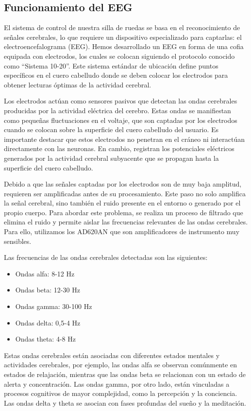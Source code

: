 \documentclass{article}
\begin{document}
\subsection{Funcionamiento del EEG}

El sistema de control de nuestra silla de ruedas se basa en el reconocimiento de señales cerebrales, lo que requiere un dispositivo especializado para captarlas: el electroencefalograma (EEG). Hemos desarrollado un EEG en forma de una cofia equipada con electrodos, los cuales se colocan siguiendo el protocolo conocido como “Sistema 10-20”. Este sistema estándar de ubicación define puntos específicos en el cuero cabelludo donde se deben colocar los electrodos para obtener lecturas óptimas de la actividad cerebral.

Los electrodos actúan como sensores pasivos que detectan las ondas cerebrales producidas por la actividad eléctrica del cerebro. Estas ondas se manifiestan como pequeñas fluctuaciones en el voltaje, que son captadas por los electrodos cuando se colocan sobre la superficie del cuero cabelludo del usuario. Es importante destacar que estos electrodos no penetran en el cráneo ni interactúan directamente con las neuronas. En cambio, registran los potenciales eléctricos generados por la actividad cerebral subyacente que se propagan hasta la superficie del cuero cabelludo.

Debido a que las señales captadas por los electrodos son de muy baja amplitud, requieren ser amplificadas antes de su procesamiento. Este paso no solo amplifica la señal cerebral, sino también el ruido presente en el entorno o generado por el propio cuerpo. Para abordar este problema, se realiza un proceso de filtrado que elimina el ruido y permite aislar las frecuencias relevantes de las ondas cerebrales. Para ello, utilizamos los AD620AN que son amplificadores de instrumento muy sensibles.

Las frecuencias de las ondas cerebrales detectadas son las siguientes:

\begin{itemize}
    \item Ondas alfa: 8-12 Hz
    \item Ondas beta: 12-30 Hz
    \item Ondas gamma: 30-100 Hz
    \item Ondas delta: 0,5-4 Hz
    \item Ondas theta: 4-8 Hz
\end{itemize}

Estas ondas cerebrales están asociadas con diferentes estados mentales y actividades cerebrales, por ejemplo, las ondas alfa se observan comúnmente en estados de relajación, mientras que las ondas beta se relacionan con un estado de alerta y concentración. Las ondas gamma, por otro lado, están vinculadas a procesos cognitivos de mayor complejidad, como la percepción y la conciencia. Las ondas delta y theta se asocian con fases profundas del sueño y la meditación.
\end{document}
